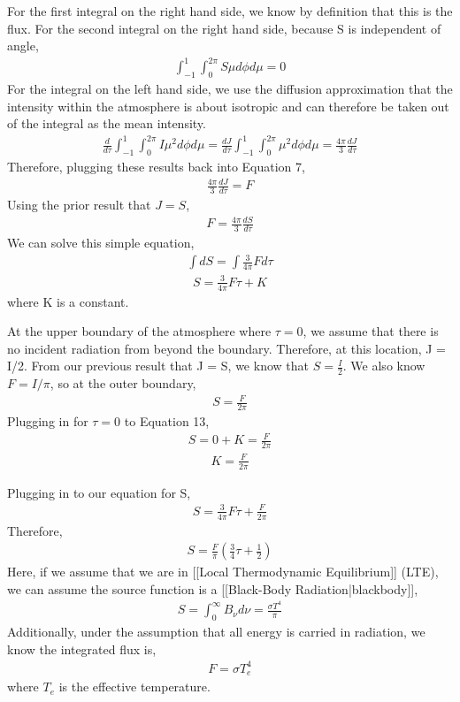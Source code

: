 \documentclass{article}
\begin{document}
For the first integral on the right hand side, we know by definition that this is the flux. For the second integral on the right hand side, because S is independent of angle,
\begin{align}
 \int_{-1}^{1} \int_{0}^{2 \pi} S \mu d \phi d \mu = 0
\end{align}
For the integral on the left hand side, we use the diffusion approximation that the intensity within the atmosphere is about isotropic and can therefore be taken out of the integral as the mean intensity.
\begin{align}
\frac{d}{d \tau} \int_{-1}^{1} \int_{0}^{2 \pi} I \mu^2 d \phi d \mu = \frac{dJ}{d \tau} \int_{-1}^{1} \int_{0}^{2 \pi}  \mu^2 d \phi d \mu = \frac{4 \pi}{3} \frac{dJ}{d \tau}
\end{align}
Therefore, plugging these results back into Equation 7,
\begin{align}
\frac{4 \pi}{3} \frac{dJ}{d \tau} = F
\end{align}
Using the prior result that $J = S$, 
\begin{align}
F = \frac{4 \pi}{3} \frac{dS}{d \tau}
\end{align}
We can solve this simple equation,
\begin{align}
 \int dS= \int\frac{3}{4 \pi} F d \tau 
\end{align}
\begin{align}
S = \frac{3}{4 \pi} F \tau + K
\end{align}
where K is a constant.

At the upper boundary of the atmosphere where $\tau = 0$, we assume that there is no incident radiation from beyond the boundary. Therefore, at this location, J = I/2. From our previous result that J = S, we know that $S= \frac{I}{2}$. We also know $F = I/ \pi$, so at the outer boundary,
\begin{align}
S = \frac{F}{2 \pi}
\end{align}
Plugging in for $\tau = 0$ to Equation 13,
\begin{align}
S = 0 + K= \frac{F}{2 \pi}
\end{align}
\begin{align}
K = \frac{F}{2 \pi}
\end{align}

Plugging in to our equation for S,
\begin{align}
S = \frac{3}{4 \pi} F \tau +  \frac{F}{2 \pi}
\end{align}
Therefore,
\begin{align}
S = \frac{F}{\pi} \left( \frac{3}{4}\tau + \frac{1}{2} \right)
\end{align}
Here, if we assume that we are in [[Local Thermodynamic Equilibrium]] (LTE), we can assume the source function is a [[Black-Body Radiation|blackbody]],
\begin{align}
S = \int_{0}^{\infty} B_{\nu} d\nu = \frac{\sigma T^4}{\pi}
\end{align}
Additionally, under the assumption that all energy is carried in radiation, we know the integrated flux is,
\begin{align}
F = \sigma T_{e}^4
\end{align}
where $T_e$ is the effective temperature.
\end{document}
